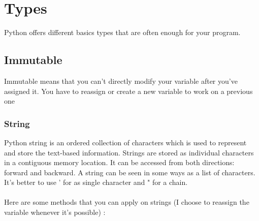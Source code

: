 \documentclass[a4paper, 12pt]{article}
\begin{document}
\clearpage
\section{Types}
Python offers different basics types that are often enough for your program.\newline

\subsection{Immutable}
Immutable means that you can't directly modify your variable after you've assigned it. You have to reassign or create a new variable to work on a previous one\newline

\subsubsection{String}
Python string is an ordered collection of characters which is used to represent and store the text-based information. Strings are stored as individual characters in a contiguous memory location. It can be accessed from both directions: forward and backward. A string can be seen in some ways as a list of characters. \\It's better to use ' for as single character and " for a chain. \\ \\
Here are some methods that you can apply on strings (I choose to reassign the variable whenever it's possible) : 
\end{document}
